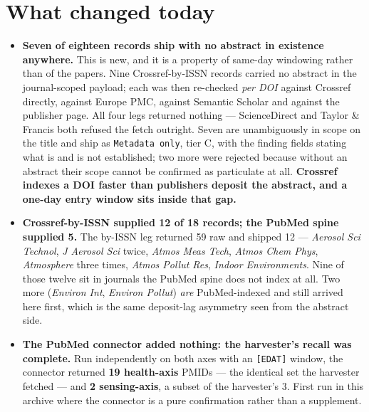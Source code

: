 \documentclass[10pt]{article}
\begin{document}
\section*{\sffamily\bfseries\color{Deep}What changed today}
\vspace{-1.5mm}{\color{Amber}\rule{\linewidth}{1.1pt}}\vspace{2.5mm}

\footnotesize
\begin{itemize}
\item \textbf{Seven of eighteen records ship with no abstract in existence anywhere.} This is
new, and it is a property of same-day windowing rather than of the papers. Nine
Crossref-by-ISSN records carried no abstract in the journal-scoped payload; each was then
re-checked \emph{per DOI} against Crossref directly, against Europe PMC, against Semantic
Scholar and against the publisher page. All four legs returned nothing --- ScienceDirect and
Taylor \& Francis both refused the fetch outright. Seven are unambiguously in scope on the
title and ship as \texttt{Metadata only}, tier C, with the finding fields stating what is and
is not established; two more were rejected because without an abstract their scope cannot be
confirmed as particulate at all. \textbf{Crossref indexes a DOI faster than publishers deposit
the abstract, and a one-day entry window sits inside that gap.}

\item \textbf{Crossref-by-ISSN supplied 12 of 18 records; the PubMed spine supplied 5.} The
by-ISSN leg returned 59 raw and shipped 12 --- \textit{Aerosol Sci Technol}, \textit{J
Aerosol Sci} twice, \textit{Atmos Meas Tech}, \textit{Atmos Chem Phys}, \textit{Atmosphere}
three times, \textit{Atmos Pollut Res}, \textit{Indoor Environments}. Nine of those twelve
sit in journals the PubMed spine does not index at all. Two more (\textit{Environ Int},
\textit{Environ Pollut}) \emph{are} PubMed-indexed and still arrived here first, which is the
same deposit-lag asymmetry seen from the abstract side.

\item \textbf{The PubMed connector added nothing: the harvester's recall was complete.} Run
independently on both axes with an \texttt{[EDAT]} window, the connector returned
\textbf{19 health-axis} PMIDs --- the identical set the harvester fetched --- and
\textbf{2 sensing-axis}, a subset of the harvester's 3. First run in this archive where the
connector is a pure confirmation rather than a supplement.


\end{itemize}
\end{document}
